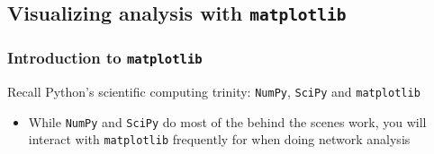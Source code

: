 \documentclass[xcolor=dvipsnames, 9pt]{beamer}
\begin{document}
\subsection{Visualizing analysis with \texttt{matplotlib}} %
\label{sub:visualizing_analysis_with_matplotlib}

\begin{frame}[fragile]
    \frametitle{Introduction to \texttt{matplotlib}}
    Recall Python's scientific computing trinity: \texttt{NumPy}, \texttt{SciPy} and \texttt{matplotlib}
    \begin{itemize}
        \item While \texttt{NumPy} and \texttt{SciPy} do most of the behind the scenes work, you will interact with \texttt{matplotlib} frequently for when doing network analysis
    \end{itemize}
    \begin{columns}
        \begin{enumerate}
        \end{enumerate}
    \end{columns}
\end{frame}
\end{document}
